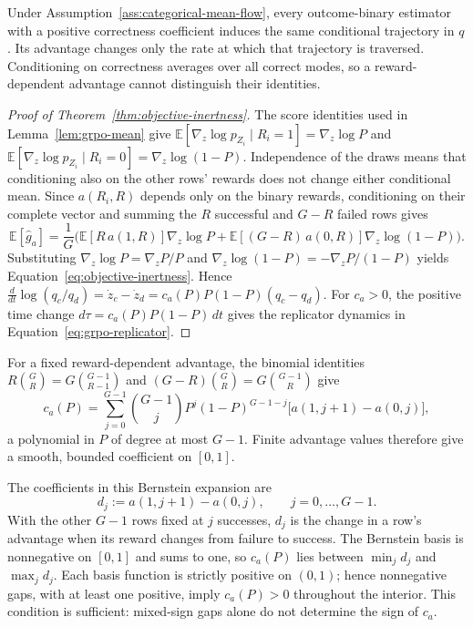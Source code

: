 \documentclass{article}
\newcommand{\enforcehalffinalproseline}{%
  \setlength{\parfillskip}{0pt plus .20\linewidth}}
\newcommand{\1}{\mathbf 1}
\newcommand{\E}{\mathbb E}
\theoremstyle{remark}
\theoremstyle{definition}
\theoremstyle{plain}
\begin{document}
Under Assumption~\ref{ass:categorical-mean-flow}, every outcome-binary
estimator with a positive correctness coefficient induces the same
conditional trajectory in $q$. Its advantage changes only the rate at which
that trajectory is traversed. Conditioning on correctness averages over all
correct modes, so a reward-dependent advantage cannot distinguish their
identities.

\begin{proof}[Proof of Theorem~\ref{thm:objective-inertness}]
\enforcehalffinalproseline
The score identities used in Lemma~\ref{lem:grpo-mean} give
$\E[\nabla_z\log p_{Z_i}\mid R_i=1]=\nabla_z\log P$ and
$\E[\nabla_z\log p_{Z_i}\mid R_i=0]=\nabla_z\log(1-P)$.
Independence of the draws means that conditioning also on the other rows'
rewards does not change either conditional mean. Since $a(R_i,R)$ depends
only on the binary rewards, conditioning on their complete vector and
summing the $R$ successful and $G-R$ failed rows gives
\[
  \E[\widehat g_a]
  =\frac1G\Big(\E[R\,a(1,R)]\nabla_z\log P
   +\E[(G-R)\,a(0,R)]\nabla_z\log(1-P)\Big).
\]
Substituting $\nabla_z\log P=\nabla_zP/P$ and
$\nabla_z\log(1-P)=-\nabla_zP/(1-P)$ yields
Equation~\eqref{eq:objective-inertness}. Hence
$\frac{d}{dt}\log(q_c/q_d)=\dot z_c-\dot z_d=c_a(P)P(1-P)(q_c-q_d)$.
For $c_a>0$, the positive time change $d\tau=c_a(P)P(1-P)\,dt$ gives
the replicator dynamics in Equation~\eqref{eq:grpo-replicator}.
\end{proof}

For a fixed reward-dependent advantage, the binomial identities
$R\binom GR=G\binom{G-1}{R-1}$ and
$(G-R)\binom GR=G\binom{G-1}{R}$ give
\begin{equation}
 c_a(P)=\sum_{j=0}^{G-1}\binom{G-1}{j}P^j(1-P)^{G-1-j}
 \big[a(1,j+1)-a(0,j)\big],
 \label{eq:inertness-polynomial}
\end{equation}
a polynomial in $P$ of degree at most $G-1$. Finite advantage values
therefore give a smooth, bounded coefficient on $[0,1]$.

The coefficients in this Bernstein expansion are
\begin{equation}
 d_j:=a(1,j+1)-a(0,j),\qquad j=0,\ldots,G-1 .
 \label{eq:leave-one-out-gap}
\end{equation}
With the other $G-1$ rows fixed at $j$ successes, $d_j$ is the change in a
row's advantage when its reward changes from failure to success. The
Bernstein basis is nonnegative on $[0,1]$ and sums to one, so $c_a(P)$ lies
between $\min_jd_j$ and $\max_jd_j$. Each basis function is strictly positive
on $(0,1)$; hence nonnegative gaps, with at least one positive, imply
$c_a(P)>0$ throughout the interior. This condition is sufficient:
mixed-sign gaps alone do not determine the sign of $c_a$.
\end{document}

